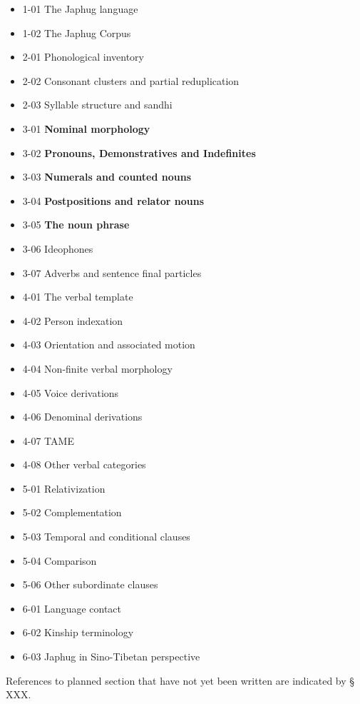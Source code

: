 \begin{itemize}
\item 1-01 The Japhug language
\item 1-02 The Japhug Corpus
\item 2-01 Phonological inventory 
\item 2-02 Consonant clusters and partial reduplication
\item 2-03 Syllable structure and sandhi
\item 3-01 \textbf{Nominal morphology}
\item 3-02 \textbf{Pronouns, Demonstratives and Indefinites}
\item 3-03 \textbf{Numerals and counted nouns}
\item 3-04 \textbf{Postpositions and relator nouns}
\item 3-05 \textbf{The noun phrase}
\item 3-06 Ideophones
\item 3-07 Adverbs and sentence final particles
\item 4-01 The verbal template
\item 4-02 Person indexation
\item 4-03 Orientation and associated motion
\item 4-04 Non-finite verbal morphology
\item 4-05 Voice derivations
\item 4-06 Denominal derivations
\item 4-07 TAME
\item 4-08 Other verbal categories
\item 5-01 Relativization
\item 5-02 Complementation
\item 5-03 Temporal and conditional clauses
\item 5-04 Comparison
\item 5-06 Other subordinate clauses
\item 6-01 Language contact
\item 6-02 Kinship terminology
\item 6-03 Japhug in Sino-Tibetan perspective
\end{itemize}

 References to planned section that have not yet been written are indicated by § XXX.
